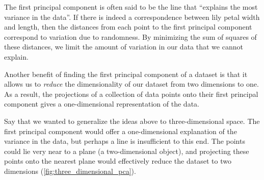 The first principal component is often said to be the line that ``explains the most variance in the data''. If there is indeed a correspondence between lily petal width and length, then the distances from each point to the first principal component correspond to variation due to randomness. By minimizing the sum of squares of these distances, we limit the amount of variation in our data that we cannot explain.

%

Another benefit of finding the first principal component of a dataset is that it allows us to \textit{reduce} the dimensionality of our dataset from two dimensions to one. As a result, the projections of a collection of data points onto their first principal component gives a one-dimensional representation of the data.

Say that we wanted to generalize the ideas above to three-dimensional space. The first principal component would offer a one-dimensional explanation of the variance in the data, but perhaps a line is insufficient to this end. The points could lie very near to a plane (a two-dimensional object), and projecting these points onto the nearest plane would effectively reduce the dataset to two dimensions (\autoref{fig:three_dimensional_pca}).

